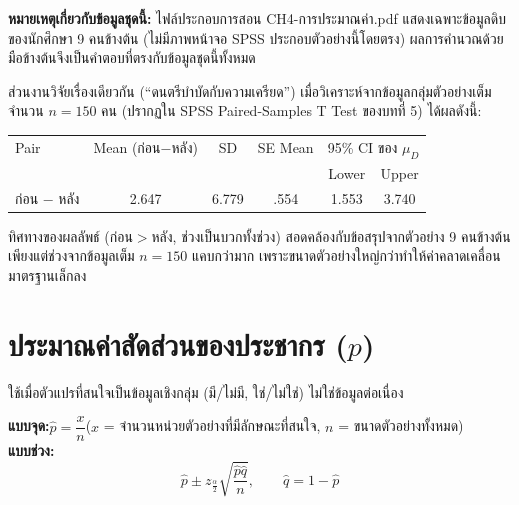 \documentclass[10pt]{extarticle}
\begin{document}
\begin{outbox}
\textbf{หมายเหตุเกี่ยวกับข้อมูลชุดนี้:} ไฟล์ประกอบการสอน CH4-การประมาณค่า.pdf แสดงเฉพาะข้อมูลดิบของนักศึกษา 9 คนข้างต้น (ไม่มีภาพหน้าจอ SPSS ประกอบตัวอย่างนี้โดยตรง) ผลการคำนวณด้วยมือข้างต้นจึงเป็นคำตอบที่ตรงกับข้อมูลชุดนี้ทั้งหมด

ส่วนงานวิจัยเรื่องเดียวกัน (``ดนตรีบำบัดกับความเครียด'') เมื่อวิเคราะห์จากข้อมูลกลุ่มตัวอย่างเต็มจำนวน $n=150$ คน (ปรากฏใน SPSS Paired-Samples T Test ของบทที่ 5) ได้ผลดังนี้:
\begin{center}\small
\begin{tabular}{@{}lccccc@{}}
\toprule
Pair & Mean (ก่อน$-$หลัง) & SD & SE Mean & \multicolumn{2}{c}{95\% CI ของ $\mu_D$}\\
& & & & Lower & Upper\\
\midrule
ก่อน $-$ หลัง & 2.647 & 6.779 & .554 & 1.553 & 3.740\\
\bottomrule
\end{tabular}
\end{center}
ทิศทางของผลลัพธ์ (ก่อน$>$หลัง, ช่วงเป็นบวกทั้งช่วง) สอดคล้องกับข้อสรุปจากตัวอย่าง 9 คนข้างต้น เพียงแต่ช่วงจากข้อมูลเต็ม $n=150$ แคบกว่ามาก เพราะขนาดตัวอย่างใหญ่กว่าทำให้ค่าคลาดเคลื่อนมาตรฐานเล็กลง
\end{outbox}

\section{ประมาณค่าสัดส่วนของประชากร ($p$)}

ใช้เมื่อตัวแปรที่สนใจเป็นข้อมูลเชิงกลุ่ม (มี/ไม่มี, ใช่/ไม่ใช่) ไม่ใช่ข้อมูลต่อเนื่อง

\begin{center}
\end{center}

\begin{formulabox}
\textbf{แบบจุด:}\quad $\hat{p}=\dfrac{x}{n}$\quad ($x$ = จำนวนหน่วยตัวอย่างที่มีลักษณะที่สนใจ, $n$ = ขนาดตัวอย่างทั้งหมด)\\[3pt]
\textbf{แบบช่วง:}\quad
$$\hat{p}\pm z_{\frac{\alpha}{2}}\sqrt{\frac{\hat{p}\hat{q}}{n}}, \qquad \hat q=1-\hat p$$
\end{formulabox}
\end{document}
